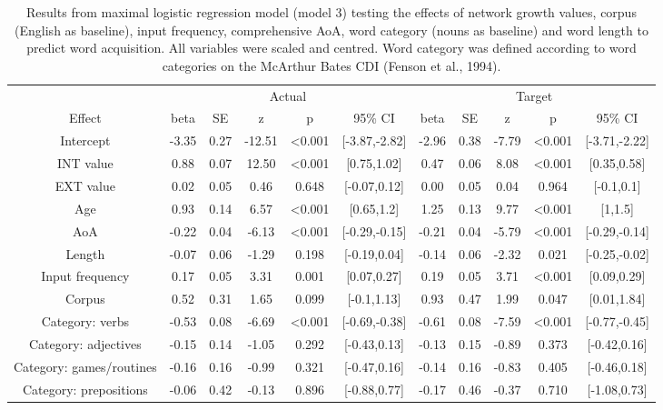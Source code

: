 \documentclass[
  man,floatsintext]{apa6}
\begin{document}
\begin{longtable}[t]{ccccccccccc}
\caption{\label{tab:full-data-summary}Results from maximal logistic regression model (model 3) testing the effects of network growth values, corpus (English as baseline), input frequency, comprehensive AoA, word category (nouns as baseline) and word length to predict word acquisition. All variables were scaled and centred. Word category was defined according to word categories on the McArthur Bates CDI (Fenson et al., 1994).}\\
\toprule
\multicolumn{1}{c}{ } & \multicolumn{5}{c}{Actual} & \multicolumn{5}{c}{Target} \\
\cmidrule(l{3pt}r{3pt}){2-6} \cmidrule(l{3pt}r{3pt}){7-11}
Effect & beta & SE & z & p & 95\% CI & beta & SE & z & p & 95\% CI\\
\midrule
Intercept & -3.35 & 0.27 & -12.51 & <0.001 & {}[-3.87,-2.82] & -2.96 & 0.38 & -7.79 & <0.001 & {}[-3.71,-2.22]\\
INT value & 0.88 & 0.07 & 12.50 & <0.001 & {}[0.75,1.02] & 0.47 & 0.06 & 8.08 & <0.001 & {}[0.35,0.58]\\
EXT value & 0.02 & 0.05 & 0.46 & 0.648 & {}[-0.07,0.12] & 0.00 & 0.05 & 0.04 & 0.964 & {}[-0.1,0.1]\\
Age & 0.93 & 0.14 & 6.57 & <0.001 & {}[0.65,1.2] & 1.25 & 0.13 & 9.77 & <0.001 & {}[1,1.5]\\
AoA & -0.22 & 0.04 & -6.13 & <0.001 & {}[-0.29,-0.15] & -0.21 & 0.04 & -5.79 & <0.001 & {}[-0.29,-0.14]\\
\addlinespace
Length & -0.07 & 0.06 & -1.29 & 0.198 & {}[-0.19,0.04] & -0.14 & 0.06 & -2.32 & 0.021 & {}[-0.25,-0.02]\\
Input frequency & 0.17 & 0.05 & 3.31 & 0.001 & {}[0.07,0.27] & 0.19 & 0.05 & 3.71 & <0.001 & {}[0.09,0.29]\\
Corpus & 0.52 & 0.31 & 1.65 & 0.099 & {}[-0.1,1.13] & 0.93 & 0.47 & 1.99 & 0.047 & {}[0.01,1.84]\\
Category: verbs & -0.53 & 0.08 & -6.69 & <0.001 & {}[-0.69,-0.38] & -0.61 & 0.08 & -7.59 & <0.001 & {}[-0.77,-0.45]\\
Category: adjectives & -0.15 & 0.14 & -1.05 & 0.292 & {}[-0.43,0.13] & -0.13 & 0.15 & -0.89 & 0.373 & {}[-0.42,0.16]\\
\addlinespace
Category: games/routines & -0.16 & 0.16 & -0.99 & 0.321 & {}[-0.47,0.16] & -0.14 & 0.16 & -0.83 & 0.405 & {}[-0.46,0.18]\\
Category: prepositions & -0.06 & 0.42 & -0.13 & 0.896 & {}[-0.88,0.77] & -0.17 & 0.46 & -0.37 & 0.710 & {}[-1.08,0.73]\\

\end{longtable}
\end{document}
